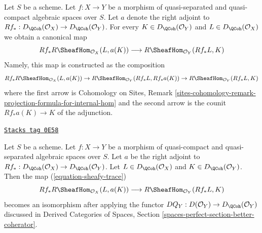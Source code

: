 Let $S$ be a scheme.
Let $f : X \to Y$ be a morphism of quasi-separated and quasi-compact
algebraic spaces over $S$.
Let $a$ denote the right adjoint to
$Rf_* : D_\QCoh(\mathcal{O}_X) \to D_\QCoh(\mathcal{O}_Y)$. For every
$K \in D_\QCoh(\mathcal{O}_Y)$ and $L \in D_\QCoh(\mathcal{O}_X)$
we obtain a canonical map
\begin{equation}
\label{equation-sheafy-trace}
Rf_*R\SheafHom_{\mathcal{O}_X}(L, a(K))
\longrightarrow
R\SheafHom_{\mathcal{O}_Y}(Rf_*L, K)
\end{equation}
Namely, this map is constructed as the composition
$$
Rf_*R\SheafHom_{\mathcal{O}_X}(L, a(K)) \to
R\SheafHom_{\mathcal{O}_Y}(Rf_*L, Rf_*a(K)) \to
R\SheafHom_{\mathcal{O}_Y}(Rf_*L, K)
$$
where the first arrow is
Cohomology on Sites, Remark
\ref{sites-cohomology-remark-projection-formula-for-internal-hom}
and the second arrow is the counit $Rf_*a(K) \to K$ of the adjunction.

\begin{lemma}
\label{spaces-duality-lemma-iso-on-RSheafHom}
\href{https://stacks.math.columbia.edu/tag/0E58}{\texttt{Stacks tag 0E58}}

Let $S$ be a scheme.
Let $f : X \to Y$ be a morphism of quasi-compact and quasi-separated
algebraic spaces over $S$.
Let $a$ be the right adjoint to
$Rf_* : D_\QCoh(\mathcal{O}_X) \to D_\QCoh(\mathcal{O}_Y)$.
Let $L \in D_\QCoh(\mathcal{O}_X)$ and
$K \in D_\QCoh(\mathcal{O}_Y)$.
Then the map (\ref{equation-sheafy-trace})
$$
Rf_*R\SheafHom_{\mathcal{O}_X}(L, a(K))
\longrightarrow
R\SheafHom_{\mathcal{O}_Y}(Rf_*L, K)
$$
becomes an isomorphism after applying the functor
$DQ_Y : D(\mathcal{O}_Y) \to D_\QCoh(\mathcal{O}_Y)$
discussed in Derived Categories of Spaces, Section
\ref{spaces-perfect-section-better-coherator}.
\end{lemma}

